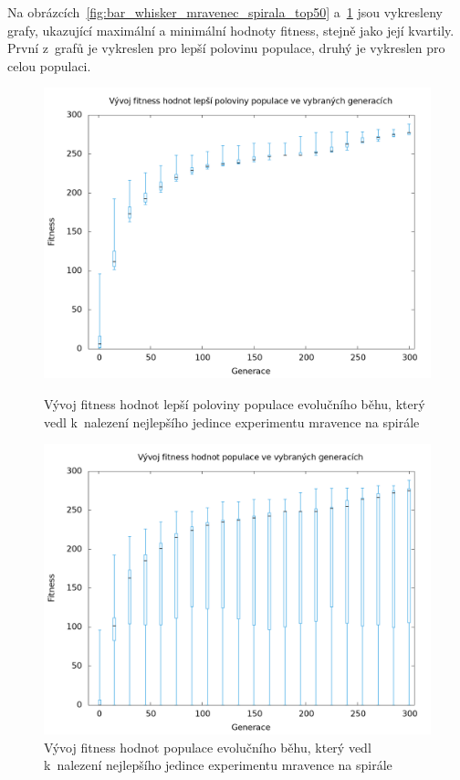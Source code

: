 Na obrázcích~\ref{fig:bar_whisker_mravenec_spirala_top50} a~\ref{fig:bar_whisker_mravenec_spirala} jsou vykresleny grafy, ukazující maximální a minimální hodnoty fitness, stejně jako její kvartily.
První z~grafů je vykreslen pro lepší polovinu populace, druhý je vykreslen pro celou populaci.

\begin{figure}[h]
    \begin{minipage}[c]{0.48\linewidth}
        \includegraphics[width=\linewidth]{obrazky/bar_whisker_mravenec_spirala_top50.png}
        \caption{Vývoj fitness hodnot lepší poloviny populace evolučního běhu, který vedl k~nalezení nejlepšího jedince experimentu mravence na spirále}
        \label{fig:bar_whisker_mravenec_spirala_top50}
    \end{minipage}
    \hfill
    \begin{minipage}[c]{0.48\linewidth}
        \includegraphics[width=\linewidth]{obrazky/bar_whisker_mravenec_spirala.png}
        \caption{Vývoj fitness hodnot populace evolučního běhu, který vedl k~nalezení nejlepšího jedince experimentu mravence na spirále}
        \label{fig:bar_whisker_mravenec_spirala}
    \end{minipage}
\end{figure}

